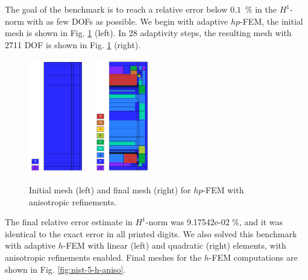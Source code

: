 The goal of the benchmark is to reach a relative error below
$0.1$~\% in the $H^1$-norm with as few DOFs as possible.
We begin with adaptive $hp$-FEM,
the initial mesh is shown in Fig. \ref{fig:nist-5-hp-aniso} (left).
In 28 adaptivity steps, the resulting mesh with 2711 DOF is shown
in Fig. \ref{fig:nist-5-hp-aniso} (right).

\begin{figure}[!ht]
\centering
\includegraphics[height=5cm]{nist/nist-5/mesh_hp_aniso_init.png}\ \
\includegraphics[height=5cm]{nist/nist-5/mesh_hp_aniso.png}
\vspace{-2mm}
\caption{Initial mesh (left) and final mesh (right) for $hp$-FEM with anisotropic refinements.}
\label{fig:nist-5-hp-aniso}
\end{figure}

The final relative error estimate in $H^1$-norm was 9.17542e-02 \%,
and it was identical to the exact error in all printed digits.
We also solved this benchmark with adaptive $h$-FEM
with linear (left) and quadratic (right)
elements, with anisotropic refinements enabled.
Final meshes for the $h$-FEM computations are shown
in Fig. \ref{fig:nist-5-h-aniso}.

